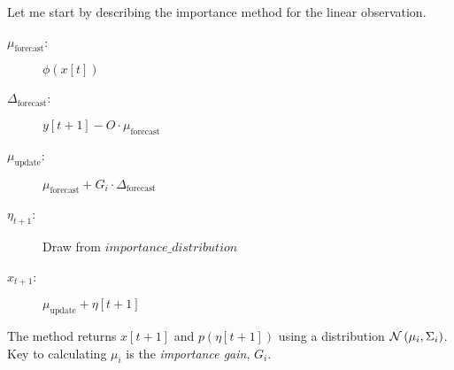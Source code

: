 \documentclass[12pt]{article}
\newcommand{\normal}[2]{{\cal N}\left(#1,#2 \right)}
\begin{document}
Let me start by describing the importance method for the linear
observation.
\begin{description}
\item[$\mu_{\text{forecast}}$:]  $\phi(x[t])$
\item[$\Delta_{\text{forecast}}$:] $y[t+1] - O \cdot \mu_{\text{forecast}}$
\item[$\mu_{\text{update}}$:]  $\mu_{\text{forecast}} + G_i \cdot
  \Delta_{\text{forecast}}$
\item[$\eta_{t+1}$:] Draw from $importance\_distribution$
\item[$x_{t+1}$:] $\mu_{\text{update}} + \eta[t+1]$
\end{description}
The method returns $x[t+1]$ and $p(\eta[t+1])$ using a distribution
$\normal{\mu_i}{\Sigma_i}$.  Key to calculating $\mu_i$ is the
\emph{importance gain}, $G_i$.
\end{document}
